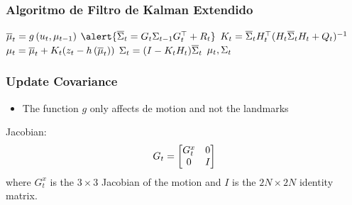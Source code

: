 \begin{frame}
    \frametitle{Algoritmo de Filtro de Kalman Extendido}
    
    \begin{algorithmic}[1]
        \State $\overline{\mu}_{t} = g\left( u_{t}, \mu_{t-1} \right)$
        \State $\alert{\overline{\covariance}_{t} = \motionModelJacobian_{t} \covariance_{t-1} \motionModelJacobian_{t}^{\top}+\motionParametersCovariance_{t}}$
        \Statex
        \State $K_{t} = \overline{\Sigma}_{t} H_{t}^{\top} (H_{t} \overline{\Sigma}_{t}  H_{t} + Q_{t})^{-1} $
        \State $\mu_{t} = \overline{\mu}_{t} + K_{t} (z_{t} - h\left( \overline{\mu}_{t} \right))$
        \State $\Sigma_{t} =  (I - K_{t} H_{t}) \overline{\Sigma}_{t}$
        \State \Return $\mu_{t}, \Sigma_{t}$
    \EndProcedure
    \end{algorithmic}
\end{frame}

\begin{frame}
    \frametitle{Update Covariance}

    \begin{itemize}
        \item The function $g$ only affects de motion and not the landmarks
    \end{itemize}

    Jacobian:
    \begin{equation*}
        G_t = 
        \begin{bmatrix}
            G_{t}^{x} & 0 \\
            0 & I
        \end{bmatrix}
    \end{equation*}
    where $G_t^x$ is the $3 \times 3$ Jacobian of the motion and $I$ is the $2N \times 2N$ identity matrix.
\end{frame}

